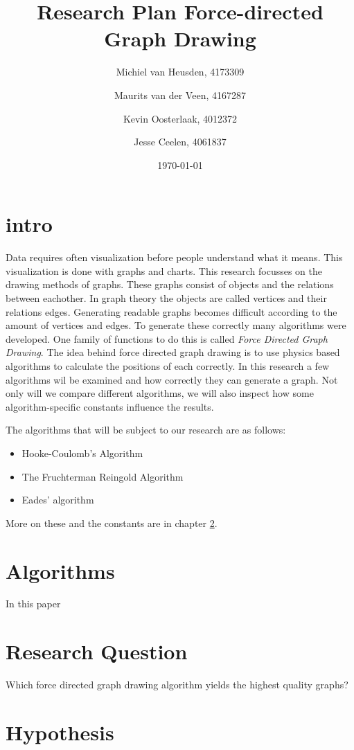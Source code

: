 \documentclass[a4paper,12pt]{article}
\title{Research Plan Force-directed Graph Drawing}
\author{Michiel van Heusden, 4173309 \and Maurits van der Veen, 4167287 \and Kevin Oosterlaak, 4012372 \and Jesse Ceelen, 4061837}
\date{\today}
\begin{document}
  \maketitle
  \tableofcontents
  \section{intro}
  Data requires often visualization before people understand what it means.
  This visualization is done with graphs and charts.
  This research focusses on the drawing methods of graphs.
  These graphs consist of objects and the relations between eachother.
  In graph theory the objects are called vertices and their relations edges.
  Generating readable graphs becomes difficult according to the amount of vertices and edges.
  To generate these correctly many algorithms were developed.
  One family of functions to do this is called \emph{Force Directed Graph Drawing}.
  The idea behind force directed graph drawing is to use physics based algorithms to calculate the positions of each correctly.
  In this research a few algorithms wil be examined and how correctly they can generate a graph.
  Not only will we compare different algorithms, we will also inspect how some algorithm-specific constants influence the results.

  The algorithms that will be subject to our research are as follows:
  \begin{itemize}
    \item Hooke-Coulomb's Algorithm
    \item The Fruchterman Reingold Algorithm
    \item Eades' algorithm
  \end{itemize}
  More on these and the constants are in chapter \ref{par:algorithms}.

  \section{Algorithms}\label{par:algorithms}
    In this paper

  \section{Research Question}
    Which force directed graph drawing algorithm yields the highest quality graphs?

  \section{Hypothesis}
\end{document}
